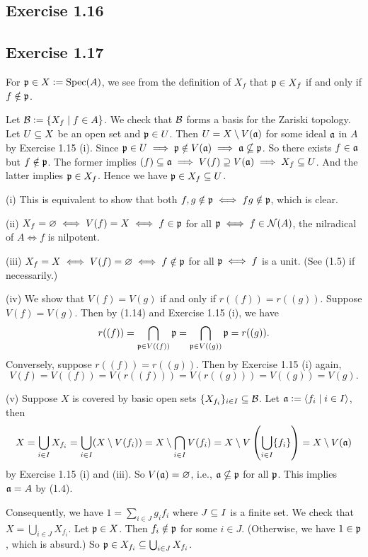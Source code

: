 \documentclass[../A&M.tex]{subfiles}
\begin{document}
\subsection*{Exercise 1.16}

\subsection*{Exercise 1.17}

For $\mathfrak{p}\in X:=\operatorname{Spec}(A)$, we see from the definition of $X_f$ that $\mathfrak{p}\in X_f$ if and only if $f\notin\mathfrak{p}$.

Let $\mathcal{B}:=\{ X_f \mid f\in A\}$. We check that $\mathcal{B}$ forms a basis for the Zariski topology. Let $U\subseteq X$ be an open set and $\mathfrak{p}\in U$. Then $U=X \setminus V(\mathfrak{a})$ for some ideal $\mathfrak{a}$ in $A$ by Exercise 1.15 (i). Since $\mathfrak{p}\in U \implies \mathfrak{p}\notin V(\mathfrak{a}) \implies \mathfrak{a}\nsubseteq\mathfrak{p}$. So there exists $f\in\mathfrak{a}$ but $f\notin\mathfrak{p}$. The former implies $(f)\subseteq\mathfrak{a} \implies V(f)\supseteq V(\mathfrak{a}) \implies X_f \subseteq U$. And the latter implies $\mathfrak{p}\in X_f$. Hence we have $\mathfrak{p} \in X_f \subseteq U$.

(i) This is equivalent to show that both $f,g \notin \mathfrak{p} \iff fg \notin \mathfrak{p}$, which is clear.

(ii) $X_f=\varnothing \iff V(f)=X \iff f\in\mathfrak{p}$ for all $\mathfrak{p} \iff f\in \mathcal{N}(A)$, the nilradical of $A \iff f$ is nilpotent.

(iii) $X_f=X \iff V(f)=\varnothing \iff f\notin\mathfrak{p}$ for all $\mathfrak{p} \iff f$ is a unit. (See (1.5) if necessarily.)

(iv) We show that $V(f)=V(g)$ if and only if $r((f))=r((g))$. Suppose $V(f)=V(g)$. Then by (1.14) and Exercise 1.15 (i), we have
$$
r((f)) = \bigcap_{\mathfrak{p}\in V((f))} \mathfrak{p} = \bigcap_{\mathfrak{p}\in V((g))} \mathfrak{p} = r((g)).
$$
Conversely, suppose $r((f))=r((g))$. Then by Exercise 1.15 (i) again,
$$
V(f) = V((f)) = V(r((f))) = V(r((g))) = V((g)) = V(g).
$$

(v) Suppose $X$ is covered by basic open sets $\{X_{f_i}\}_{i\in I} \subseteq \mathcal{B}$. Let $\mathfrak{a}:=\langle f_i \mid i\in I \rangle$, then
$$
X = \bigcup_{i\in I} X_{f_i} = \bigcup_{i\in I} (X\setminus V(f_i)) = X\setminus  \bigcap_{i\in I} V(f_i) = X \setminus V\left( \bigcup_{i\in I} \{f_i\} \right) = X\setminus V(\mathfrak{a})
$$
by Exercise 1.15 (i) and (iii). So $V(\mathfrak{a})=\varnothing$, i.e., $\mathfrak{a}\nsubseteq\mathfrak{p}$ for all $\mathfrak{p}$. This implies $\mathfrak{a}=A$ by (1.4).

Consequently, we have $1=\sum_{i\in J} g_if_i$ where $J\subseteq I$ is a finite set. We check that $X=\bigcup_{i\in J} X_{f_i}$. Let $\mathfrak{p}\in X$. Then $f_i\notin \mathfrak{p}$ for some $i\in J$. (Otherwise, we have $1\in \mathfrak{p}$, which is absurd.) So $\mathfrak{p}\in X_{f_i} \subseteq \bigcup_{i\in J} X_{f_i}$.
\end{document}
